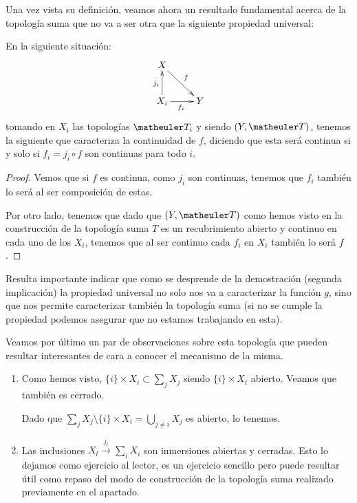 Una vez vista su definición, veamos ahora un resultado fundamental acerca de la topología suma que no va a ser otra que la siguiente propiedad universal:

\begin{lem}
	En la siguiente situación:
	\[\xymatrix{
		X \ar[rd]^f & \\
		X_i \ar[u]^{j_i} \ar[r]_{f_i} &
		Y
	}\]
	tomando en $X_i$ las topologías $\T_i$ y siendo $(Y,\T)$, tenemos la siguiente  que caracteriza la continuidad de $f$, diciendo que esta será continua si y solo si  $f_i=j_i\circ f$ son continuas para todo $i$.
	
	\begin{proof}
		Vemos que si $f$ es continua, como $j_i$ son continuas, tenemos que $f_i$ también lo será al ser composición de estas.
		
		Por otro lado, tenemos que dado que $(Y,\T)$ como hemos visto en la construcción de la topología suma $T$ es un recubrimiento abierto y continuo en cada uno de los $X_i$, tenemos que al ser continuo cada $f_i$ en $X_i$ también lo será $f$.
	\end{proof}
\end{lem}

Resulta importante indicar que como se desprende de la demostración (segunda implicación) la propiedad universal no solo nos va a caracterizar la función $g$, sino que nos permite caracterizar también la topología suma (si no se cumple la propiedad podemos asegurar que no estamos trabajando en esta). 

\begin{obs}
	Veamos por último un par de observaciones sobre esta topología que pueden resultar interesantes de cara a conocer el mecanismo de la misma.
	\begin{enumerate}
	\item Como hemos visto, $\{i\}\times X_i\subset\sum_j X_j$ siendo $\{i\}\times X_i$ abierto. Veamos que también es cerrado.
	
	Dado que $\sum_j X_j\setminus \{i\}\times X_i=\bigcup_{j\ne i }X_j$ es abierto, lo tenemos.
	
	\item Las inclusiones $X_l\stackrel{j_l}\longrightarrow\sum_iX_i$ son inmersiones abiertas y cerradas. Esto lo dejamos como ejercicio al lector, es un ejercicio sencillo pero puede resultar útil como repaso del modo de construcción de la topología suma realizado previamente en el apartado. \qedhere
\end{enumerate}
\end{obs}
